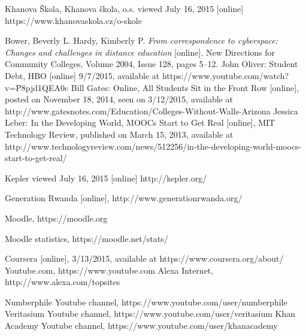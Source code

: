 
\def\bibname{Bibliography}
\begin{thebibliography}{99}
\addcontentsline{toc}{chapter}{\bibname}


Khanova Škola, Khanova škola, o.s. viewed July 16, 2015 [online]
https://www.khanovaskola.cz/o-skole




{\sc Bower,} Beverly L. {\sc Hardy,} Kimberly P.
\emph{From correspondence to cyberspace: Changes and challenges in distance education} [online].
New Directions for Community Colleges, Volume 2004, Issue 128, pages 5–12.
John Oliver: Student Debt, HBO [online] 9/7/2015, available at https://www.youtube.com/watch?v=P8pjd1QEA0c
Bill Gates: Online, All Students Sit in the Front Row [online], posted on November 18, 2014, seen on 3/12/2015, available at http://www.gatesnotes.com/Education/Colleges-Without-Walls-Arizona
Jessica Leber: In the Developing World, MOOCs Start to Get Real [online], MIT Technology Review, published on March 15, 2013, available at http://www.technologyreview.com/news/512256/in-the-developing-world-moocs-start-to-get-real/

Kepler viewed July 16, 2015 [online]
http://kepler.org/

Generation Rwanda [online], http://www.generationrwanda.org/

Moodle, https://moodle.org

Moodle statistics, https://moodle.net/stats/


Coursera [online], 3/13/2015, available at https://www.coursera.org/about/
Youtube.com, https://www.youtube.com
Alexa Internet, http://www.alexa.com/topsites

Numberphile Youtube channel, https://www.youtube.com/user/numberphile
Veritasium Youtube channel, https://www.youtube.com/user/veritasium
Khan Academy Youtube channel, https://www.youtube.com/user/khanacademy



\end{thebibliography}
